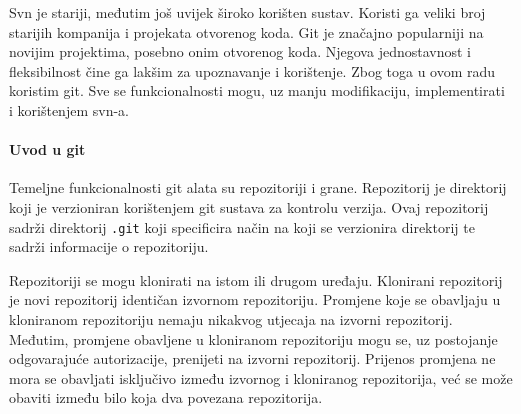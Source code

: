 \documentclass[times, utf8, diplomski, numeric]{fer}
\begin{document}
Svn je stariji, međutim još uvijek široko korišten sustav. Koristi ga veliki broj starijih kompanija i projekata otvorenog koda. Git je značajno popularniji na novijim projektima, posebno onim otvorenog koda. Njegova jednostavnost i fleksibilnost čine ga lakšim za upoznavanje i korištenje. Zbog toga u ovom radu koristim git. Sve se funkcionalnosti mogu, uz manju modifikaciju, implementirati i korištenjem svn-a.

\paragraph{Uvod u git}

Temeljne funkcionalnosti git alata su repozitoriji i grane. Repozitorij je direktorij koji je verzioniran korištenjem git sustava za kontrolu verzija. Ovaj repozitorij sadrži direktorij \verb|.git| koji specificira način na koji se verzionira direktorij te sadrži informacije o repozitoriju.

Repozitoriji se mogu klonirati na istom ili drugom uređaju. Klonirani repozitorij je novi repozitorij identičan izvornom repozitoriju. Promjene koje se obavljaju u kloniranom repozitoriju nemaju nikakvog utjecaja na izvorni repozitorij. Međutim, promjene obavljene u kloniranom repozitoriju mogu se, uz postojanje odgovarajuće autorizacije, prenijeti na izvorni repozitorij. Prijenos promjena ne mora se obavljati isključivo između izvornog i kloniranog repozitorija, već se može obaviti između bilo koja dva povezana repozitorija.
\end{document}
